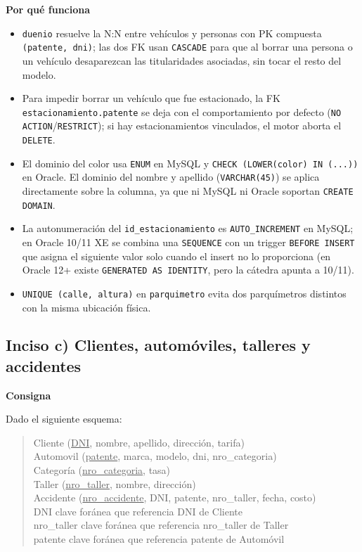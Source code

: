\documentclass[11pt,a4paper]{article}
\newcommand{\itemcabecera}[1]{\noindent\textbf{#1}\par\medskip}
\newcommand{\bloqueConsigna}{\itemcabecera{Consigna}}
\newcommand{\bloquePorque}{\itemcabecera{Por qu\'e funciona}}
\newenvironment{esquema}{%
    \begin{quote}\ttfamily\small\setlength{\parskip}{0pt}\setlength{\parindent}{0pt}%
}{\end{quote}}
\begin{document}
\bloquePorque

\begin{itemize}
    \item \texttt{duenio} resuelve la N:N entre vehículos y personas con PK compuesta \texttt{(patente, dni)}; las dos FK usan \texttt{CASCADE} para que al borrar una persona o un vehículo desaparezcan las titularidades asociadas, sin tocar el resto del modelo.
    \item Para impedir borrar un vehículo que fue estacionado, la FK \texttt{estacionamiento.patente} se deja con el comportamiento por defecto (\texttt{NO ACTION}/\texttt{RESTRICT}); si hay estacionamientos vinculados, el motor aborta el \texttt{DELETE}.
    \item El dominio del color usa \texttt{ENUM} en MySQL y \texttt{CHECK (LOWER(color) IN (...))} en Oracle. El dominio del nombre y apellido (\texttt{VARCHAR(45)}) se aplica directamente sobre la columna, ya que ni MySQL ni Oracle soportan \texttt{CREATE DOMAIN}.
    \item La autonumeración del \texttt{id\_estacionamiento} es \texttt{AUTO\_INCREMENT} en MySQL; en Oracle 10/11 XE se combina una \texttt{SEQUENCE} con un trigger \texttt{BEFORE INSERT} que asigna el siguiente valor solo cuando el insert no lo proporciona (en Oracle 12+ existe \texttt{GENERATED AS IDENTITY}, pero la cátedra apunta a 10/11).
    \item \texttt{UNIQUE (calle, altura)} en \texttt{parquimetro} evita dos parquímetros distintos con la misma ubicación física.
\end{itemize}

\subsection{Inciso c) Clientes, automóviles, talleres y accidentes}

\bloqueConsigna

Dado el siguiente esquema:

\begin{esquema}
Cliente (\underline{DNI}, nombre, apellido, direcci\'on, tarifa)\\
Automovil (\underline{patente}, marca, modelo, dni, nro\_categoria)\\
Categor\'ia (\underline{nro\_categoria}, tasa)\\
Taller (\underline{nro\_taller}, nombre, direcci\'on)\\
Accidente (\underline{nro\_accidente}, DNI, patente, nro\_taller, fecha, costo)\\[4pt]
\hspace*{1em} DNI clave for\'anea que referencia DNI de Cliente\\
\hspace*{1em} nro\_taller clave for\'anea que referencia nro\_taller de Taller\\
\hspace*{1em} patente clave for\'anea que referencia patente de Autom\'ovil
\end{esquema}
\end{document}
